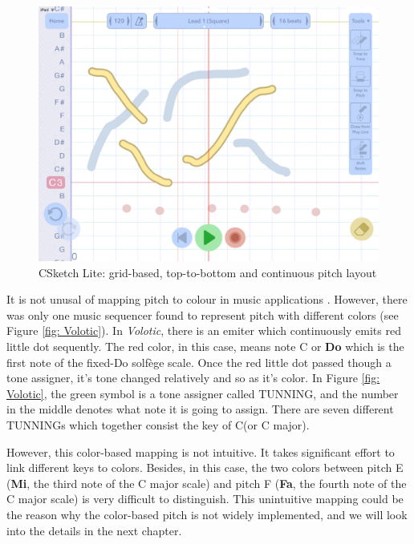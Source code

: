\bigskip
\begin{figure}[h]
  \includegraphics[width=12 cm]{images/CSketch_Lite.PNG}
  \centering
  \caption{CSketch Lite: grid-based, top-to-bottom and continuous pitch layout}
  \label{fig: CSketch}
\end{figure}
\bigskip

It is not unusal of mapping pitch to colour in music applications \citep{Reference14}. However, there was only one music sequencer found to represent pitch with different colors (see Figure \ref{fig: Volotic}). In \textit{Volotic}, there is an emiter which continuously emits red little dot sequently. The red color, in this case, means note C or \textbf{Do} which is the first note of the fixed-Do solfège scale. Once the red little dot passed though a tone assigner, it's tone changed relatively and so as it's color. In Figure \ref{fig: Volotic}, the green symbol is a tone assigner called TUNNING, and the number in the middle denotes what note it is going to assign. There are seven different TUNNINGs which together consist the key of C(or C major).

However, this color-based mapping is not intuitive. It takes significant effort to link different keys to colors. Besides, in this case, the two colors between pitch E (\textbf{Mi}, the third note of the C major scale) and pitch F (\textbf{Fa}, the fourth note of the C major scale) is very difficult to distinguish. This unintuitive mapping could be the reason why the color-based pitch is not widely implemented, and we will look into the details in the next chapter.

